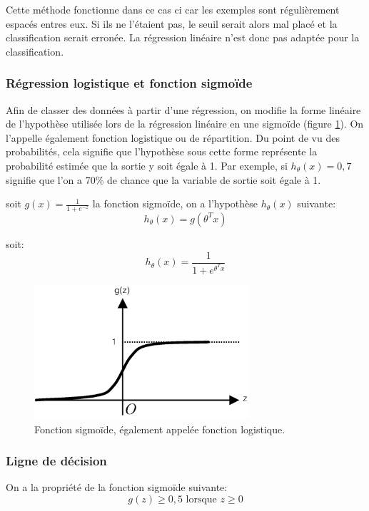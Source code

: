 Cette méthode fonctionne dans ce cas ci car les exemples sont régulièrement espacés entres eux. Si ils ne l'étaient pas, le seuil serait alors mal placé et la classification serait erronée. La régression linéaire n'est donc pas adaptée pour la classification. 

\subsubsection{Régression logistique et fonction sigmoïde}
\label{Le Machine Learning: Les différents algorithmes: La regression logistique: Régression logistique et fonction sigmoïde}
Afin de classer des données à partir d'une régression,  on modifie la forme linéaire de l'hypothèse utilisée lors de la régression linéaire en une sigmoïde (figure 	\ref{fig:Fonction sigmoïde}). On l'appelle également fonction logistique ou de répartition. Du point de vu des probabilités, cela signifie que l'hypothèse sous cette forme représente la probabilité estimée que la sortie y soit égale à 1. Par exemple, si $h_\theta(x)=0,7$ signifie que l'on a 70\% de chance que la variable de sortie soit égale à 1.  

soit $g(x) = \frac{1}{1 + e^{-z}}$  la fonction sigmoïde, on a l'hypothèse $h_\theta(x)$ suivante: 
\begin{equation}
	h_\theta(x)=g(\theta^Tx) 
\end{equation}

soit: 
\begin{equation}
h_\theta(x)=\frac{1}{1 + e^{\theta^Tx}} 
\end{equation}

\begin{figure}[h]
	\centering\includegraphics[height=5cm]{images/sigmoid.png}
	\caption[Fonction sigmoïde]{Fonction sigmoïde, également appelée fonction logistique.}
	\label{fig:Fonction sigmoïde}
\end{figure}

\subsubsection{Ligne de décision}
\label{Le Machine Learning: Les différents algorithmes: La regression logistique: Ligne de décision}
On a la propriété de la fonction sigmoïde suivante: 
\begin{equation}
 g(z) \ge 0,5 \text{ lorsque } z \ge 0
\end{equation}

